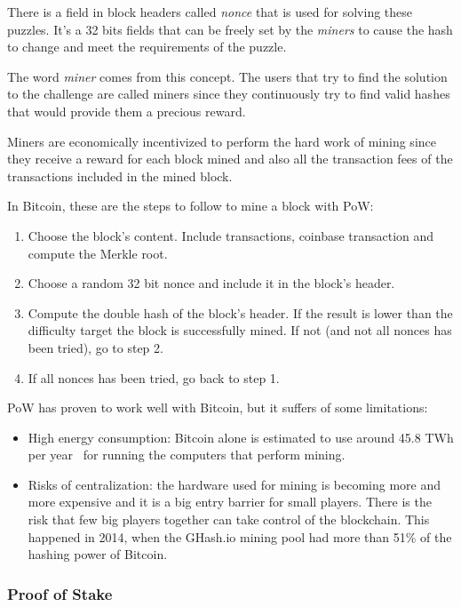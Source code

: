 There is a field in block headers called \textit{nonce} that is used for solving these puzzles. It's a 32 bits fields that can be freely set by the \textit{miners} to cause the hash to change and meet the requirements of the puzzle.

The word \textit{miner} comes from this concept. The users that try to find the solution to the challenge are called miners since they continuously try to find valid hashes that would provide them a precious reward. 

Miners are economically incentivized to perform the hard work of mining since they receive a reward for each block mined and also all the transaction fees of the transactions included in the mined block.

In Bitcoin, these are the steps to follow to mine a block with PoW:

\begin{enumerate}
    \item Choose the block's content. Include transactions, coinbase transaction and compute the Merkle root.
    \item Choose a random 32 bit nonce and include it in the block's header.
    \item Compute the double hash of the block's header. If the result is lower than the difficulty target the block is successfully mined. If not (and not all nonces has been tried), go to step 2.
    \item If all nonces has been tried, go back to step 1. 
\end{enumerate}

PoW has proven to work well with Bitcoin, but it suffers of some limitations:

\begin{itemize}
    \item High energy consumption: Bitcoin alone is estimated to use around 45.8 TWh per year~\cite{bitcoin-footprint} for running the computers that perform mining.
    \item Risks of centralization: the hardware used for mining is becoming more and more expensive and it is a big entry barrier for small players. There is the risk that few big players together can take control of the blockchain. This happened in 2014, when the GHash.io mining pool had more than 51\% of the hashing power of Bitcoin.
\end{itemize}

\subsubsection{Proof of Stake}

